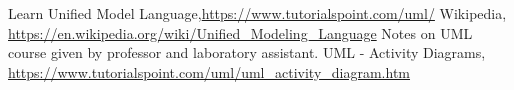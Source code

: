 \begin{thebibliography}{99999}
\singlespace\normalsize

 Learn Unified Model Language,\url{https://www.tutorialspoint.com/uml/}
 Wikipedia, \url{https://en.wikipedia.org/wiki/Unified_Modeling_Language}
 Notes on UML course given by professor and laboratory assistant.
UML - Activity Diagrams, \url{https://www.tutorialspoint.com/uml/uml_activity_diagram.htm}

\end{thebibliography}
